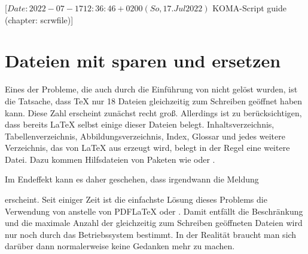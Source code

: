 %
%
%
%
%
%
%

                 [$Date: 2022-07-17 12:36:46 +0200 (So, 17. Jul 2022) $
                  KOMA-Script guide (chapter: scrwfile)]

\chapter{Dateien mit  sparen und ersetzen}

\BeginIndexGroup
{}
Eines der Probleme, die auch durch die Einführung von \eTeX{} nicht gelöst
wurden, ist die Tatsache, dass \TeX{} nur 18 Dateien gleichzeitig zum Schreiben
geöffnet haben kann. Diese Zahl erscheint zunächst recht groß. Allerdings ist
zu berücksichtigen, dass bereits \LaTeX{} selbst einige dieser Dateien
belegt. Inhaltsverzeichnis, Tabellenverzeichnis, Abbildungsverzeichnis, Index,
Glossar und jedes weitere Verzeichnis, das von \LaTeX{} aus erzeugt wird,
belegt in der Regel eine weitere Datei. Dazu kommen Hilfsdateien von Paketen
wie  oder .

Im Endeffekt kann es daher geschehen, dass irgendwann die Meldung
erscheint. Seit einiger Zeit ist die einfachste Lösung dieses Problems die
Verwendung von \LuaLaTeX{} anstelle von PDF\LaTeX{} oder \XeLaTeX. Damit
entfällt die Beschränkung und die maximale Anzahl der gleichzeitig zum
Schreiben geöffneten Dateien wird nur noch durch das Betriebssystem
bestimmt. In der Realität braucht man sich darüber dann normalerweise keine
Gedanken mehr zu machen.

